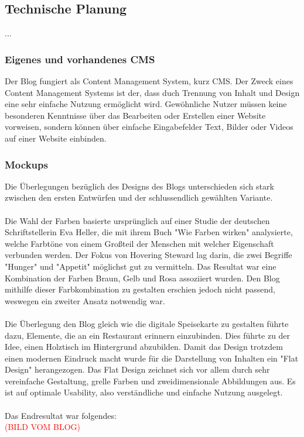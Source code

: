   \subsection{Technische Planung}
  ...

    \subsubsection{Eigenes und vorhandenes CMS}
    Der Blog fungiert als Content Management System, kurz CMS. Der Zweck eines
    Content Management Systems ist der, dass duch Trennung von Inhalt und Design eine
    sehr einfache Nutzung ermöglicht wird. Gewöhnliche Nutzer müssen keine besonderen
    Kenntnisse über das Bearbeiten oder Erstellen einer Website vorweisen, sondern
    können über einfache Eingabefelder Text, Bilder oder Videos auf einer Website einbinden.

    \subsubsection{Mockups}
    Die Überlegungen bezüglich des Designs des Blogs unterschieden sich stark zwischen den ersten
    Entwürfen und der schlussendlich gewählten Variante.\\
    \\
    Die Wahl der Farben basierte ursprünglich auf einer Studie der deutschen Schriftstellerin Eva Heller,
    die mit ihrem Buch {"Wie Farben wirken"\cite{WieFarbenWirken}} analysierte, welche Farbtöne von einem Großteil der Menschen
    mit welcher Eigenschaft verbunden werden. Der Fokus von Hovering Steward lag darin, die zwei Begriffe "Hunger"
    und "Appetit" möglichst gut zu vermitteln. Das Resultat war eine Kombination der Farben Braun, Gelb und Rosa
    assoziiert wurden. Den Blog mithilfe dieser Farbkombination zu gestalten erschien jedoch nicht passend, weswegen
    ein zweiter Ansatz notwendig war.\\
    \\
    Die Überlegung den Blog gleich wie die digitale Speisekarte zu gestalten führte dazu, Elemente, die an ein Restaurant
    erinnern einzubinden. Dies führte zu der Idee, einen Holztisch im Hintergrund abzubilden.
    Damit das Design trotzdem einen modernen Eindruck macht wurde für die Darstellung von Inhalten ein {"Flat Design"\cite{FlatDesign}}
    herangezogen. Das Flat Design zeichnet sich vor allem durch sehr vereinfache Gestaltung, grelle Farben und zweidimensionale Abbildungen aus.
    Es ist auf optimale Usability, also verständliche und einfache Nutzung ausgelegt.\\
    \\
    Das Endresultat war folgendes:\\
    \textcolor{red}{(BILD VOM BLOG)}\\

